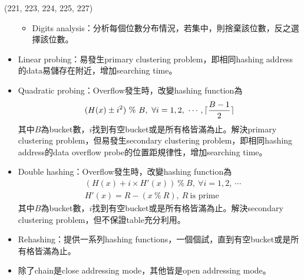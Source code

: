 \begin{theorem}{(221, 223, 224, 225, 227)}
\begin{itemize}
\begin{itemize}
            \item Digits analysis：分析每個位數分布情況，若集中，則捨棄該位數，反之選擇該位數。
        \end{itemize}
        \item Linear probing：易發生primary clustering problem，即相同hashing address的data易儲存在附近，增加searching time。
        \item Quadratic probing：Overflow發生時，改變hashing function為\begin{equation}
            (H(x) \pm i^2) \ \% \ B, \ \forall i = 1, 2, \ \cdots, \lceil\frac{B - 1}{2}\rceil
        \end{equation} 其中$B$為bucket數，$i$找到有空bucket或是所有格皆滿為止。解決primary clustering problem，但易發生secondary clustering problem，即相同hashing address的data overflow probe的位置距規律性，增加searching time。
        \item Double hashing：Overflow發生時，改變hashing function為\begin{equation}
            \begin{aligned}
                & (H(x) + i \times H'(x)) \ \% \ B, \ \forall i = 1, 2, \ \cdots \\
                & H'(x) = R - (x \ \% \ R), \ R \ \text{is prime}
            \end{aligned}
        \end{equation} 其中$B$為bucket數，$i$找到有空bucket或是所有格皆滿為止。解決secondary clustering problem，但不保證table充分利用。
        \item Rehashing：提供一系列hashing functions，一個個試，直到有空bucket或是所有格皆滿為止。
        \item 除了chain是close addressing mode，其他皆是open addressing mode。
    \end{itemize}
\end{theorem}
